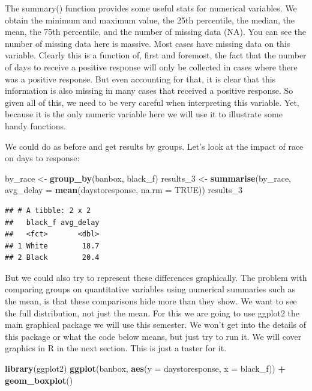 \documentclass[]{book}
\newenvironment{Shaded}{\begin{snugshade}}{\end{snugshade}}
\newcommand{\DataTypeTok}[1]{\textcolor[rgb]{0.13,0.29,0.53}{#1}}
\newcommand{\DecValTok}[1]{\textcolor[rgb]{0.00,0.00,0.81}{#1}}
\newcommand{\KeywordTok}[1]{\textcolor[rgb]{0.13,0.29,0.53}{\textbf{#1}}}
\newcommand{\NormalTok}[1]{#1}
\newcommand{\OperatorTok}[1]{\textcolor[rgb]{0.81,0.36,0.00}{\textbf{#1}}}
\newcommand{\OtherTok}[1]{\textcolor[rgb]{0.56,0.35,0.01}{#1}}
\newcommand{\StringTok}[1]{\textcolor[rgb]{0.31,0.60,0.02}{#1}}
\theoremstyle{definition}
\theoremstyle{definition}
\theoremstyle{definition}
\theoremstyle{remark}
\begin{document}
The summary() function provides some useful stats for numerical
variables. We obtain the minimum and maximum value, the 25th percentile,
the median, the mean, the 75th percentile, and the number of missing
data (NA). You can see the number of missing data here is massive. Most
cases have missing data on this variable. Clearly this is a function of,
first and foremost, the fact that the number of days to receive a
positive response will only be collected in cases where there was a
positive response. But even accounting for that, it is clear that this
information is also missing in many cases that received a positive
response. So given all of this, we need to be very careful when
interpreting this variable. Yet, because it is the only numeric variable
here we will use it to illustrate some handy functions.

We could do as before and get results by groups. Let's look at the
impact of race on days to response:

\begin{Shaded}
\begin{Highlighting}[]
\NormalTok{by_race <-}\StringTok{ }\KeywordTok{group_by}\NormalTok{(banbox, black_f)}
\NormalTok{results_}\DecValTok{3}\NormalTok{ <-}\StringTok{ }\KeywordTok{summarise}\NormalTok{(by_race,}
  \DataTypeTok{avg_delay =} \KeywordTok{mean}\NormalTok{(daystoresponse, }\DataTypeTok{na.rm =} \OtherTok{TRUE}\NormalTok{))}
\NormalTok{results_}\DecValTok{3}
\end{Highlighting}
\end{Shaded}

\begin{verbatim}
## # A tibble: 2 x 2
##   black_f avg_delay
##   <fct>       <dbl>
## 1 White        18.7
## 2 Black        20.4
\end{verbatim}

But we could also try to represent these differences graphically. The
problem with comparing groups on quantitative variables using numerical
summaries such as the mean, is that these comparisons hide more than
they show. We want to see the full distribution, not just the mean. For
this we are going to use ggplot2 the main graphical package we will use
this semester. We won't get into the details of this package or what the
code below means, but just try to run it. We will cover graphics in R in
the next section. This is just a taster for it.

\begin{Shaded}
\begin{Highlighting}[]
\KeywordTok{library}\NormalTok{(ggplot2)}
\KeywordTok{ggplot}\NormalTok{(banbox, }\KeywordTok{aes}\NormalTok{(}\DataTypeTok{y =}\NormalTok{ daystoresponse, }\DataTypeTok{x =}\NormalTok{ black_f)) }\OperatorTok{+}\StringTok{ }
\StringTok{  }\KeywordTok{geom_boxplot}\NormalTok{() }
\end{Highlighting}
\end{Shaded}
\end{document}
